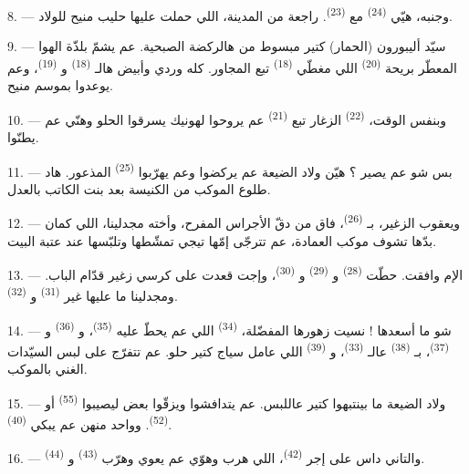 8. --- وجنبه، هيّي  \textsuperscript{(24)} مع
 \textsuperscript{(23)}. راجعة من المدينة، اللي حملت
عليها حليب منيح للولاد.

\VUsaut{4.0mm}
\VUsaut{3.4mm}

9. --- سيّد أليبورون (الحمار) كتير مبسوط من هالركضة الصبحية. عم يشمّ
بلذّة الهوا المعطّر بريحة  \textsuperscript{(20)} اللي
مغطّي  \textsuperscript{(18)} تبع 
المجاور. كله وردي وأبيض هالـ \textsuperscript{(18)}
و \textsuperscript{(19)}، وعم يوعدوا بموسم منيح.

10. --- وبنفس الوقت،  \textsuperscript{(22)} الزغار
تبع  \textsuperscript{(21)} عم يروحوا لهونيك يسرقوا
 الحلو وهنّي عم يطنّوا.

11. --- بس شو عم يصير ؟ هيّن ولاد الضيعة عم يركضوا وعم يهرّبوا
 \textsuperscript{(25)} المذعور. هاد طلوع الموكب من
الكنيسة بعد  بنت الكاتب بالعدل.

12. --- ويعقوب الزغير، بـ \textsuperscript{(26)}، فاق من
دقّ الأجراس المفرح، وأخته مجدلينا، اللي كمان بدّها تشوف موكب العمادة،
عم تترجّى إمّها تيجي تمشّطها وتلبّسها عند عتبة البيت.

13. --- الإم وافقت. حطّت  \textsuperscript{(28)}
و \textsuperscript{(29)} و
\textsuperscript{(30)}، وإجت قعدت على كرسي زغير قدّام الباب. ومجدلينا
ما عليها غير  \textsuperscript{(31)}
و \textsuperscript{(32)}.

14. --- شو ما أسعدها ! نسيت زهورها المفضّلة، 
\textsuperscript{(34)} اللي عم يحطّ عليه 
\textsuperscript{(35)}، و \textsuperscript{(36)}
و \textsuperscript{(37)}، بـ
\textsuperscript{(38)} عالـ \textsuperscript{(33)}،
و \textsuperscript{(39)} اللي عامل سياج كتير حلو. عم تتفرّج
على لبس السيّدات الغني بالموكب.

15. --- ولاد الضيعة ما بينتبهوا كتير عاللبس. عم يتدافشوا ويزقّوا بعض
ليصيبوا  \textsuperscript{(55)} أو 
\textsuperscript{(52)}. وواحد منهن عم يبكي \textsuperscript{(40)}.

16. --- والتاني داس على إجر  \textsuperscript{(42)}، اللي
هرب وهوّي عم يعوي وهرّب  \textsuperscript{(43)}
و \textsuperscript{(44)}.

